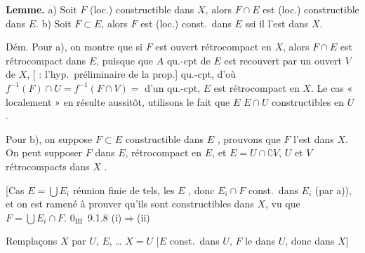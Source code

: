 \documentclass[11pt,a4paper]{article}
\begin{document}
\ill{}

\textbf{Lemme.} a) Soit $F$ (loc.) constructible dans $X$,  alors $F\cap E$ est (loc.) constructible dans $E$.
b) Soit $F\subset E$,  alors $F$ est (loc.) const.\ dans $E$ ssi il l'est dans $X$.


Dém. Pour a), on montre que si $F$ est ouvert rétrocompact en $X$, alors $F\cap E$ est rétrocompact dans $E$, puisque \ill{} \ill{} que $A$ \ill{} qu.-cpt  de $E$ est recouvert par un ouvert $V$ de $X$, \ill{} \ill{} \ill{} [ : l'hyp.\ préliminaire de la prop.]  qu.-cpt, d'où $f^{-1}(F)\cap U=f^{-1}(F\cap V)=$  d'un qu.-cpt,   $E$ est rétrocompact en $X$.   Le cas « localement » en résulte aussitôt, utilisons le fait que $E$ \ill{}  $E\cap U$ constructibles en  $U$ .

Pour b), on suppose $F\subset E$ constructible dans $E$ , prouvons que $F$ l'est dans $X$. On peut supposer $F$   dans $E$, rétrocompact en $E$, et \add{(\ill{} \ill{})} $E=U\cap \complement V$, $U$ et $V$ rétrocompacts dans $X$ .

[Cas $E=\bigcup E_i$ réunion finie de tels, les  \ill{} $E$ \ill{}, donc $E_i\cap F$ const.\ dans $E_i$ (par a)), et on est ramené à prouver qu'ils sont constructibles dans $X$, vu que $F=\bigcup E_i\cap F$. $0_{\mathrm{III}}$~9.1.8 (i)$\Rightarrow$(ii)

Remplaçons $X$ par $U$, \ill{}  \ill{} $E$, \ldots
{}  $X=U$ [$E$  const.\ dans $U$, $F$    le  dans $U$, donc dans $X$] \struck{\ill{} \ill{}}

\end{document}
